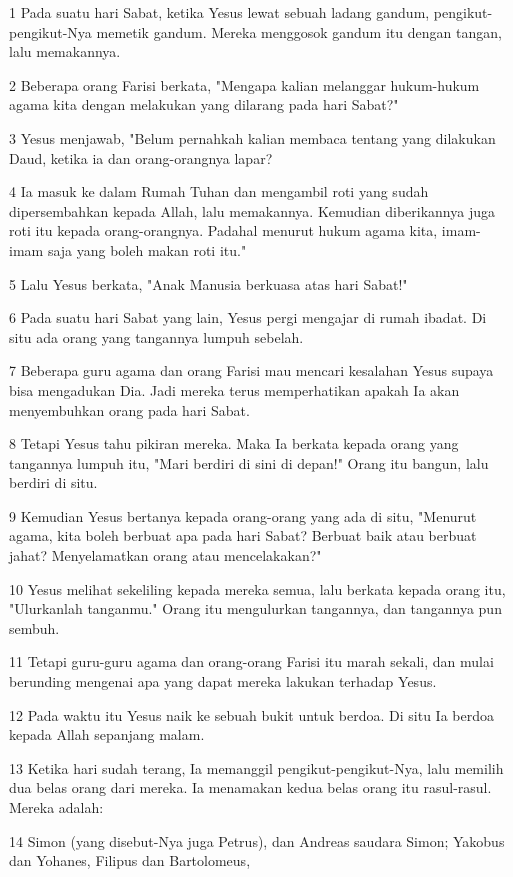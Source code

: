 \par 1 Pada suatu hari Sabat, ketika Yesus lewat sebuah ladang gandum, pengikut-pengikut-Nya memetik gandum. Mereka menggosok gandum itu dengan tangan, lalu memakannya.
\par 2 Beberapa orang Farisi berkata, "Mengapa kalian melanggar hukum-hukum agama kita dengan melakukan yang dilarang pada hari Sabat?"
\par 3 Yesus menjawab, "Belum pernahkah kalian membaca tentang yang dilakukan Daud, ketika ia dan orang-orangnya lapar?
\par 4 Ia masuk ke dalam Rumah Tuhan dan mengambil roti yang sudah dipersembahkan kepada Allah, lalu memakannya. Kemudian diberikannya juga roti itu kepada orang-orangnya. Padahal menurut hukum agama kita, imam-imam saja yang boleh makan roti itu."
\par 5 Lalu Yesus berkata, "Anak Manusia berkuasa atas hari Sabat!"
\par 6 Pada suatu hari Sabat yang lain, Yesus pergi mengajar di rumah ibadat. Di situ ada orang yang tangannya lumpuh sebelah.
\par 7 Beberapa guru agama dan orang Farisi mau mencari kesalahan Yesus supaya bisa mengadukan Dia. Jadi mereka terus memperhatikan apakah Ia akan menyembuhkan orang pada hari Sabat.
\par 8 Tetapi Yesus tahu pikiran mereka. Maka Ia berkata kepada orang yang tangannya lumpuh itu, "Mari berdiri di sini di depan!" Orang itu bangun, lalu berdiri di situ.
\par 9 Kemudian Yesus bertanya kepada orang-orang yang ada di situ, "Menurut agama, kita boleh berbuat apa pada hari Sabat? Berbuat baik atau berbuat jahat? Menyelamatkan orang atau mencelakakan?"
\par 10 Yesus melihat sekeliling kepada mereka semua, lalu berkata kepada orang itu, "Ulurkanlah tanganmu." Orang itu mengulurkan tangannya, dan tangannya pun sembuh.
\par 11 Tetapi guru-guru agama dan orang-orang Farisi itu marah sekali, dan mulai berunding mengenai apa yang dapat mereka lakukan terhadap Yesus.
\par 12 Pada waktu itu Yesus naik ke sebuah bukit untuk berdoa. Di situ Ia berdoa kepada Allah sepanjang malam.
\par 13 Ketika hari sudah terang, Ia memanggil pengikut-pengikut-Nya, lalu memilih dua belas orang dari mereka. Ia menamakan kedua belas orang itu rasul-rasul. Mereka adalah:
\par 14 Simon (yang disebut-Nya juga Petrus), dan Andreas saudara Simon; Yakobus dan Yohanes, Filipus dan Bartolomeus,
